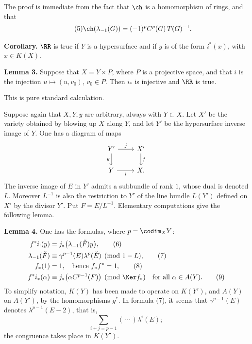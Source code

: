 The proof is immediate from the fact that \(\ch\) is a homomorphism of rings, and that
\begin{equation}\tag{5}
  \ch(\lambda_{-1}(G))=(-1)^pC^p(G)\,T(G)^{-1}.
\end{equation}

\textbf{Corollary.} \(\RR\) is true if \(Y\) is a hypersurface and if \(y\) is of the form \(i^*(x)\), with \(x\in K(X)\).

\textbf{Lemma 3.} Suppose that \(X=Y\times P\), where \(P\) is a projective space, and that \(i\) is the injection \(u\mapsto (u,v_0)\), \(v_0\in P\). Then \(i_*\) is injective and \(\RR\) is true.

This is pure standard calculation.

Suppose again that \(X,Y,y\) are arbitrary, always with \(Y\subset X\). Let \(X'\) be the variety obtained by blowing up \(X\) along \(Y\), and let \(Y'\) be the hypersurface inverse image of \(Y\). One has a diagram of maps
\[
\begin{tikzcd}
Y' \arrow[r,"j"] \arrow[d,"g"'] & X' \arrow[d,"f"]\\
Y \arrow[r,"i"'] & X .
\end{tikzcd}
\]
The inverse image of \(E\) in \(Y'\) admits a subbundle of rank \(1\), whose dual is denoted \(L\). Moreover \(L^{-1}\) is also the restriction to \(Y'\) of the line bundle \(L(Y')\) defined on \(X'\) by the divisor \(Y'\). Put \(F=E/L^{-1}\). Elementary computations give the following lemma.

\textbf{Lemma 4.} One has the formulas, where \(p=\codim_XY\):
\begin{align}
  f^*i_!(y)&=j_*\bigl(\lambda_{-1}(\check F)y\bigr), \tag{6}\\
  \lambda_{-1}(\check F)&\equiv \gamma^{p-1}(E)\lambda^p(\check E)
    \pmod{1-L}, \tag{7}\\
  f_*(1)&=1,\quad\text{hence }f_*f^*=1, \tag{8}\\
  f^*i_*(\alpha)&\equiv j_*\bigl(\alpha C^{p-1}(F)\bigr)
    \pmod{\Ker f_*}\quad\text{for all }\alpha\in A(Y). \tag{9}
\end{align}
To simplify notation, \(K(Y)\) has been made to operate on \(K(Y')\), and \(A(Y)\) on \(A(Y')\), by the homomorphisms \(g^*\). In formula (7), it seems that \(\gamma^{p-1}(E)\) denotes \(\lambda^{p-1}(E-2)\), that is,
\[
  \sum_{i+j=p-1}(\,\cdots\,)\lambda^i(E);
\]
the congruence takes place in \(K(Y')\).

